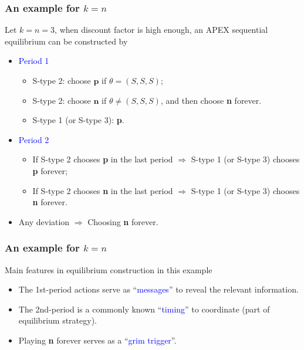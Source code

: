 \documentclass[10pt]{beamer}
\begin{document}
\begin{frame}
  \frametitle{An example for $k=n$}
\begin{center}
\end{center}

  
Let \alert{$k=n=3$}, when discount factor is high enough, an APEX sequential equilibrium can be constructed by
\begin{itemize}

\item \textcolor{blue}{Period 1}
\begin{itemize}
\item S-type 2: choose $\textbf{p}$ if $\theta=(S,S,S)$;
\item S-type 2: choose $\textbf{n}$ if $\theta\neq (S,S,S)$, and then choose \alert{\textbf{n} forever}.
\item S-type 1 (or S-type 3): \textbf{p}.
\end{itemize}

\item \textcolor{blue}{Period 2}
\begin{itemize}
\item If S-type 2 chooses \textbf{p} in the last period $\Rightarrow$ S-type 1 (or S-type 3) chooses \textbf{p} forever; 
\item If S-type 2 chooses \textbf{n} in the last period $\Rightarrow$ S-type 1 (or S-type 3) chooses \alert{\textbf{n} forever}.
\end{itemize}
 
 \item Any deviation $\Rightarrow$ Choosing \alert<1->{\textbf{n} forever}.
\end{itemize}

\end{frame}


\begin{frame}
  \frametitle{An example for $k=n$}
Main features in equilibrium construction in this example
\begin{itemize}
\item The \alert{1st-period} actions serve as ``\textcolor{blue}{messages}'' to reveal the relevant information.
\item The \alert{2nd-period} is a commonly known ``\textcolor{blue}{timing}'' to coordinate (part of equilibrium strategy).
\item \alert{Playing \textbf{n} forever} serves as a ``\textcolor{blue}{grim trigger}''.
\end{itemize}  
\end{frame}
\end{document}
